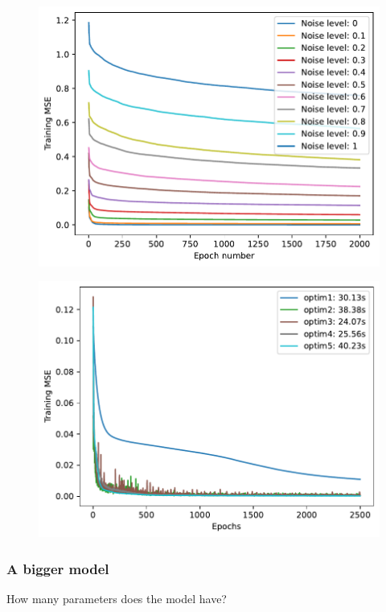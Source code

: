 \documentclass{article}
\newenvironment{task}[1]{
  \begin{tcolorbox}[
    colback=highlight!5!white,
    colframe=highlight,
    title={Task #1}
  ]
}{
  \end{tcolorbox}
}
\begin{document}
\begin{figure}[ht!]
  \centering
  \begin{minipage}{0.48\textwidth}
    \centering
    \includegraphics[width=0.9\linewidth]{ex1_noise-level.pdf}
    \label{fig:ex1_noise-level}
  \end{minipage}%
  \begin{minipage}{0.48\textwidth}
    \centering
    \includegraphics[width=0.9\linewidth]{ex1_optimizers.pdf}
    \label{fig:ex1_optimizers}
  \end{minipage}
\end{figure}


\subsubsection*{A bigger model}
\begin{task}{1.3.5}
  How many parameters does the model have?
\end{task}
\end{document}
